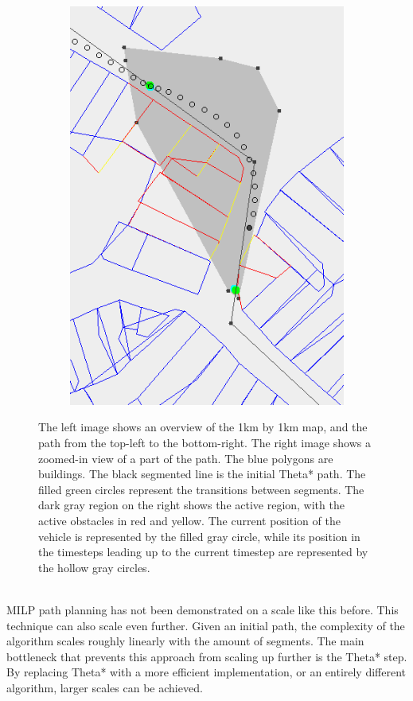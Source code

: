 \documentclass[12pt]{article}
\begin{document}
\begin{figure}[h]
\begin{subfigure}[b]{0.35\textwidth}
        \includegraphics[width=\textwidth]{img/zoomed}
    \end{subfigure}
    \caption{The left image shows an overview of the 1km by 1km map, and the path from the top-left to the bottom-right. The right image shows a zoomed-in view of a part of the path. The blue polygons are buildings. The black segmented line is the initial Theta* path. The filled green circles represent the transitions between segments. The dark gray region on the right shows the active region, with the active obstacles in red and yellow. The current position of the vehicle is represented by the filled gray circle, while its position in the timesteps leading up to the current timestep are represented by the hollow gray circles.}\label{fig:example}
\end{figure}
\\
MILP path planning has not been demonstrated on a scale like this before. This technique can also scale even further. Given an initial path, the complexity of the algorithm scales roughly linearly with the amount of segments. The main bottleneck that prevents this approach from scaling up further is the Theta* step. By replacing Theta* with a more efficient implementation, or an entirely different algorithm, larger scales can be achieved.

\newpage


\end{document}
